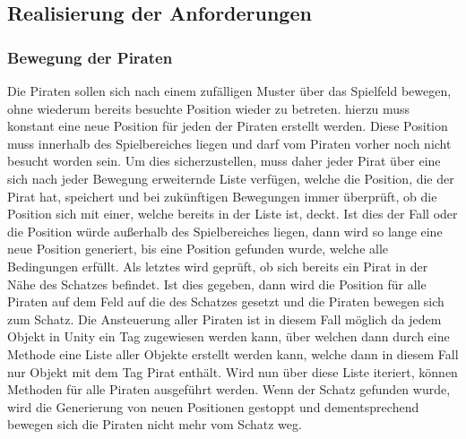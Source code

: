 \documentclass[
	12pt, %
	a4paper,
	listof=totoc, %
	bibliography=totoc, %
	numbers=noenddot, %
	ngerman, %
	headsepline, %
	oneside %
	]{scrbook} %
\begin{document}
\subsection{Realisierung der Anforderungen}
\subsubsection{Bewegung der Piraten}
Die Piraten sollen sich nach einem zufälligen Muster über das Spielfeld bewegen, ohne wiederum bereits besuchte Position wieder zu betreten. hierzu muss konstant eine neue Position für jeden der Piraten erstellt werden. Diese Position muss innerhalb des Spielbereiches liegen und darf vom Piraten vorher noch nicht besucht worden sein. Um dies sicherzustellen, muss daher jeder Pirat über eine sich nach jeder Bewegung erweiternde Liste verfügen, welche die Position, die der Pirat hat, speichert und bei zukünftigen Bewegungen immer überprüft, ob die Position sich mit einer, welche bereits in der Liste ist, deckt. Ist dies der Fall oder die Position würde außerhalb des Spielbereiches liegen, dann wird so lange eine neue Position generiert, bis eine Position gefunden wurde, welche alle Bedingungen erfüllt. Als letztes wird geprüft, ob sich bereits ein Pirat in der Nähe des Schatzes befindet. Ist dies gegeben, dann wird die Position für alle Piraten auf dem Feld auf die des Schatzes gesetzt und die Piraten bewegen sich zum Schatz. Die Ansteuerung aller Piraten ist in diesem Fall möglich da jedem Objekt in Unity ein Tag zugewiesen werden kann, über welchen dann durch eine Methode eine Liste aller Objekte erstellt werden kann, welche dann in diesem Fall nur Objekt mit dem Tag Pirat enthält. Wird nun über diese Liste iteriert, können Methoden für alle Piraten ausgeführt werden. Wenn der Schatz gefunden wurde, wird die Generierung von neuen Positionen gestoppt und dementsprechend bewegen sich die Piraten nicht mehr vom Schatz weg. 
\end{document}
